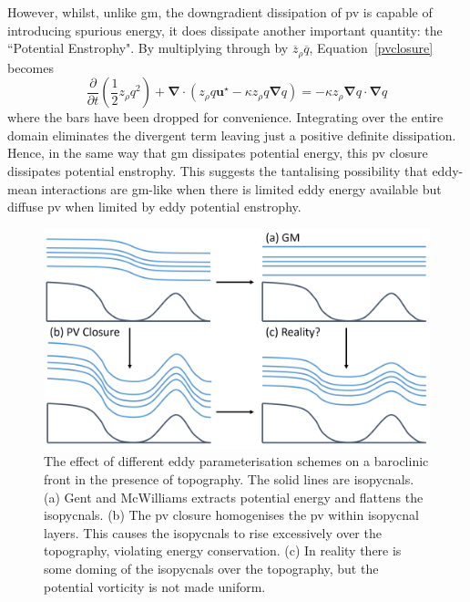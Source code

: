 \documentclass[12pt,a4paper]{report}
\newcommand*\mean[1]{\overline{#1}}
\newcommand*\equref[1]{Equation~\eqref{#1}}
\newcommand*{\half}{\frac{1}{2}}
\begin{document}
                However, whilst, unlike \gls{gm}, the downgradient
                dissipation of \gls{pv} is capable of introducing spurious energy, it does
                dissipate another important quantity: 
                the ``Potential Enstrophy". By multiplying through 
                by $\mean{z}_{\rho} \mean{q}$, \equref{pvclosure} becomes 
                \begin{equation}
                \frac{\partial  }{\partial t}\left(\half z_{\rho}q^{2}\right) + \boldsymbol{\nabla}\cdot\left(z_{\rho}q\boldsymbol{u}^\star-\kappa z_{\rho}q\boldsymbol{\nabla} q
                \right)=-\kappa z_\rho \boldsymbol{\nabla}q\cdot\boldsymbol{\nabla}q
                \end{equation}
                where the bars have been dropped for convenience.
                Integrating over the entire domain eliminates the divergent term
                leaving just a positive definite dissipation.
                Hence, in the same way that \gls{gm} dissipates potential energy, this
                \gls{pv} closure dissipates potential enstrophy. This suggests the tantalising
                possibility that eddy-mean interactions are \gls{gm}-like when
                there is limited eddy energy available but diffuse \gls{pv} when
                limited by eddy potential enstrophy.
                
                \begin{figure}
                	\centering
                	\includegraphics[width=0.8\linewidth]{am00modified}
                	\caption[Cold-doming]{The effect of different
                		eddy parameterisation schemes on a baroclinic front in
                		the presence of topography. 
                		The solid lines are isopycnals. (a) 
                		Gent and McWilliams extracts potential energy and
                		flattens the isopycnals. 
                		(b) The \gls{pv} closure homogenises
                		the \gls{pv} within isopycnal layers. This causes the
                		isopycnals to rise excessively over the topography, violating energy
                		conservation. (c) In reality there is some doming of the isopycnals
                		over the topography, but the potential vorticity is not made uniform.
                		}
                	\label{fig:Colddoming}
                \end{figure}
                
\end{document}
